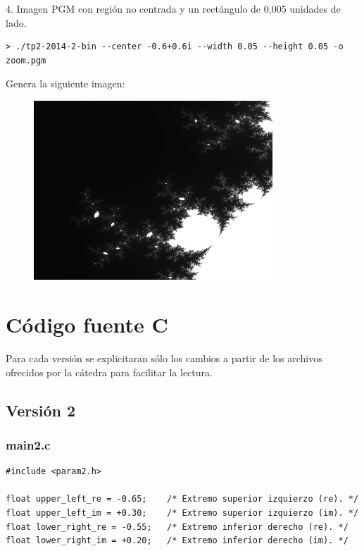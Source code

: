 \documentclass[a4paper,10pt]{article}
\begin{document}
4. Imagen PGM con regi\'on no centrada y un rect\'angulo de 0,005 unidades de lado.
\begin{verbatim}
> ./tp2-2014-2-bin --center -0.6+0.6i --width 0.05 --height 0.05 -o zoom.pgm
\end{verbatim}
Genera la siguiente imagen:
\begin{figure}
\begin{center}
\includegraphics[width=0.8\textwidth]{./zoom.png}
\label{fig:Regi\'on comprendida entre -0.625 + 0.625i y -0.575 + 0.575i.}
\caption{}
\end{center}
\end{figure}


\section{C\'odigo fuente C}
Para cada versión se explicitaran sólo los cambios a partir de los archivos ofrecidos por la cátedra para facilitar la lectura.

\subsection{Versión 2}
\subsubsection{main2.c}
\begin{verbatim}
#include <param2.h>

float upper_left_re = -0.65;	/* Extremo superior izquierzo (re). */
float upper_left_im = +0.30;	/* Extremo superior izquierzo (im). */
float lower_right_re = -0.55;	/* Extremo inferior derecho (re). */
float lower_right_im = +0.20;	/* Extremo inferior derecho (im). */
\end{verbatim}
\end{document}
